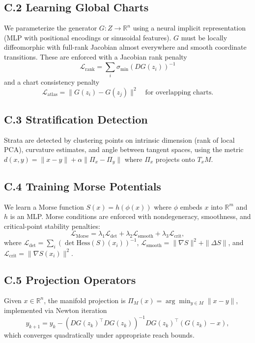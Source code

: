 \documentclass[11pt,a4paper,twocolumn]{article}
\begin{document}
\subsection*{C.2 Learning Global Charts}

We parameterize the generator $G : Z \to \mathbb{R}^n$ using a neural
implicit representation (MLP with positional encodings or sinusoidal
features). $G$ must be locally diffeomorphic with full-rank Jacobian
almost everywhere and smooth coordinate transitions. These are enforced
with a Jacobian rank penalty
\[
\mathcal{L}_{\mathrm{rank}} = \sum_i \sigma_{\min}(DG(z_i))^{-1}
\]
and a chart consistency penalty
\[
\mathcal{L}_{\mathrm{atlas}} =
\|G(z_i) - G(z_j)\|^2 \quad \text{for overlapping charts}.
\]

\subsection*{C.3 Stratification Detection}

Strata are detected by clustering points on intrinsic dimension (rank
of local PCA), curvature estimates, and angle between tangent spaces,
using the metric $d(x,y) = \|x-y\| + \alpha\|\Pi_x - \Pi_y\|$ where
$\Pi_x$ projects onto $T_xM$.

\subsection*{C.4 Training Morse Potentials}

We learn a Morse function $S(x) = h(\phi(x))$ where $\phi$ embeds $x$
into $\mathbb{R}^m$ and $h$ is an MLP. Morse conditions are enforced
with nondegeneracy, smoothness, and critical-point stability penalties:
\[
\mathcal{L}_{\mathrm{Morse}} =
\lambda_1\mathcal{L}_{\mathrm{det}} +
\lambda_2\mathcal{L}_{\mathrm{smooth}} +
\lambda_3\mathcal{L}_{\mathrm{crit}},
\]
where $\mathcal{L}_{\mathrm{det}} = \sum_i(\det\mathrm{Hess}(S)(x_i))^{-1}$,
$\mathcal{L}_{\mathrm{smooth}} = \|\nabla S\|^2 + \|\Delta S\|$, and
$\mathcal{L}_{\mathrm{crit}} = \|\nabla S(x_i)\|^2$.

\subsection*{C.5 Projection Operators}

Given $x \in \mathbb{R}^n$, the manifold projection is
$\Pi_M(x) = \arg\min_{y \in M}\|x-y\|$, implemented via Newton
iteration
\[
y_{k+1} = y_k - (DG(z_k)^\top DG(z_k))^{-1}
DG(z_k)^\top (G(z_k) - x),
\]
which converges quadratically under appropriate reach bounds.
\end{document}
